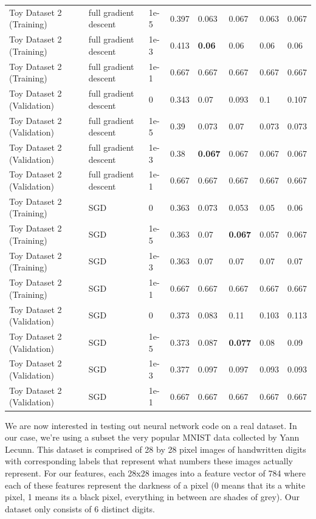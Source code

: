 \documentclass[10pt]{article}
\begin{document}
\begin{table}
\begin{tabular}{llllllll}
Toy Dataset 2 (Training) & full gradient descent & 1e-5 &   0.397 & 0.063 & 0.067 & 0.063 & 0.067 \\
Toy Dataset 2 (Training) & full gradient descent & 1e-3 &  0.413 & \bf{0.06}  & 0.06  & 0.06  & 0.06  \\
Toy Dataset 2 (Training) & full gradient descent & 1e-1 &  0.667 & 0.667 & 0.667 & 0.667 & 0.667 \\
\midrule
Toy Dataset 2 (Validation) & full gradient descent & 0 &      0.343 & 0.07  & 0.093 & 0.1   & 0.107 \\
Toy Dataset 2 (Validation) & full gradient descent & 1e-5 &   0.39  & 0.073 & 0.07  & 0.073 & 0.073 \\
Toy Dataset 2 (Validation) & full gradient descent & 1e-3 &  0.38  & \bf{0.067} & 0.067 & 0.067 & 0.067 \\
Toy Dataset 2 (Validation) & full gradient descent & 1e-1 &  0.667 & 0.667 & 0.667 & 0.667 & 0.667 \\
\midrule
Toy Dataset 2 (Training) & SGD & 0 &       0.363 & 0.073 & 0.053 & 0.05  & 0.06  \\
Toy Dataset 2 (Training) & SGD & 1e-5 &   0.363 & 0.07  & \bf{0.067} & 0.057 & 0.067 \\
Toy Dataset 2 (Training) & SGD & 1e-3 &   0.363 & 0.07  & 0.07  & 0.07  & 0.07  \\
Toy Dataset 2 (Training) & SGD & 1e-1 &   0.667 & 0.667 & 0.667 & 0.667 & 0.667 \\
\midrule
Toy Dataset 2 (Validation) & SGD & 0 &       0.373 & 0.083 & 0.11  & 0.103 & 0.113 \\
Toy Dataset 2 (Validation) & SGD & 1e-5 &   0.373 & 0.087 & \bf{0.077} & 0.08  & 0.09  \\
Toy Dataset 2 (Validation) & SGD & 1e-3 &   0.377 & 0.097 & 0.097 & 0.093 & 0.093 \\
Toy Dataset 2 (Validation) & SGD & 1e-1 &   0.667 & 0.667 & 0.667 & 0.667 & 0.667 \\
\bottomrule
\end{tabular}
\end{table}

We are now interested in testing out neural network code on a real dataset. In our case, we're using a subset the very popular MNIST data collected by Yann Lecunn. This dataset is comprised of 28 by 28 pixel images of handwritten digits with corresponding labels that represent what numbers these images actually represent. For our features, each 28x28 images into a feature vector of 784 where each of these features represent the darkness of a pixel (0 means that its a white pixel, 1 means its a black pixel, everything in between are shades of grey). Our dataset only consists of 6 distinct digits. 
\end{document}
